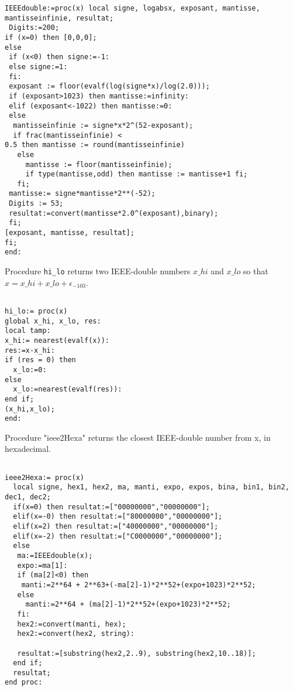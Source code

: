 \begin{lstlisting}[caption={IEEEdouble},firstnumber=1]
IEEEdouble:=proc(x) local signe, logabsx, exposant, mantisse, mantisseinfinie, resultat; 
 Digits:=200;
if (x=0) then [0,0,0]; 
else 
 if (x<0) then signe:=-1:
 else signe:=1:
 fi:
 exposant := floor(evalf(log(signe*x)/log(2.0)));
 if (exposant>1023) then mantisse:=infinity:
 elif (exposant<-1022) then mantisse:=0:
 else 
  mantisseinfinie := signe*x*2^(52-exposant);
  if frac(mantisseinfinie) <
0.5 then mantisse := round(mantisseinfinie)
   else
     mantisse := floor(mantisseinfinie);
     if type(mantisse,odd) then mantisse := mantisse+1 fi;
   fi;
 mantisse:= signe*mantisse*2**(-52);
 Digits := 53;
 resultat:=convert(mantisse*2.0^(exposant),binary);
 fi;
[exposant, mantisse, resultat];
fi;
end:
\end{lstlisting}

Procedure \texttt{hi\_lo} returns two IEEE-double numbers $x\_hi$ and $x\_lo$ so that $x = x\_hi + x\_lo + \epsilon_{-103}$.

\begin{lstlisting}[caption={hi\_lo},firstnumber=1]

hi_lo:= proc(x)
global x_hi, x_lo, res:
local tamp:
x_hi:= nearest(evalf(x)):
res:=x-x_hi:
if (res = 0) then
  x_lo:=0:
else
  x_lo:=nearest(evalf(res)):
end if;
(x_hi,x_lo);
end:
\end{lstlisting}
\vspace{0.5cm}



Procedure "ieee2Hexa" returns the closest IEEE-double number from x, in hexadecimal.

\begin{lstlisting}[caption={ieee2Hexa},firstnumber=1]

ieee2Hexa:= proc(x)
  local signe, hex1, hex2, ma, manti, expo, expos, bina, bin1, bin2, dec1, dec2;
  if(x=0) then resultat:=["00000000","00000000"];
  elif(x=-0) then resultat:=["80000000","00000000"];
  elif(x=2) then resultat:=["40000000","00000000"];
  elif(x=-2) then resultat:=["C0000000","00000000"];
  else
   ma:=IEEEdouble(x);
   expo:=ma[1]:
   if (ma[2]<0) then 
    manti:=2**64 + 2**63+(-ma[2]-1)*2**52+(expo+1023)*2**52;
   else 
     manti:=2**64 + (ma[2]-1)*2**52+(expo+1023)*2**52;
   fi:
   hex2:=convert(manti, hex); 
   hex2:=convert(hex2, string):  
  
   resultat:=[substring(hex2,2..9), substring(hex2,10..18)];
  end if;
  resultat;
end proc:
\end{lstlisting}
\vspace{0.5cm}

